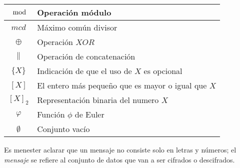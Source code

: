 \begin{table}[H]
\begin{center}
\begin{tabular}{c|l}
      \hline
      $\mod$ & Operación módulo \\
      \hline
      $mcd$ & Máximo común divisor \\
      \hline
      $\oplus$ & Operación $XOR$ \\
      \hline
      $\parallel$ & Operación de concatenación \\
      \hline
      $\{X\}$ & Indicación de que el uso de $X$ es opcional \\
      \hline
      $[X]$ & El entero más pequeño que es mayor o igual que $X$ \\
      \hline
      $[X]_2$ & Representación binaria del numero $X$ \\
      \hline
      $\varphi$ & Función $\phi$ de Euler \\
      \hline
      $\emptyset$ & Conjunto vacío \\
      \hline
    \end{tabular}
  \end{center}
\end{table}

Es menester aclarar que un mensaje no consiste solo en letras y números;
el \textit{mensaje} se refiere al conjunto de datos que van a ser
cifrados o descifrados.
